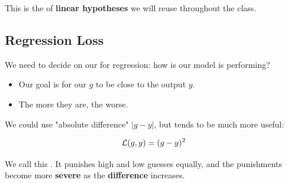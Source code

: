         This is the  of \textbf{linear hypotheses} we will reuse throughout the class.

    \pagebreak
        
    \subsection{Regression Loss}
    
        We need to decide on our  for regression: how  is our model is performing?

        \begin{itemize}
            \item Our goal is for our  $g$ to be close to the  output $y$. 

            \item The more  they are, the worse.
        \end{itemize}

        We could use "absolute difference" $|g-y|$, but  tends to be much more useful:
        
        \begin{equation}
            \mathcal{L}(g,y) = (g-y)^2
        \end{equation}
        
        We call this . It punishes high and low guesses equally, and the punishments become more \textbf{severe} as the \textbf{difference} increases.
        \\

